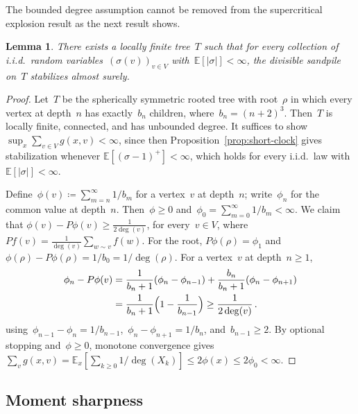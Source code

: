 \documentclass[aop]{imsart}
\theoremstyle{plain}
\newtheorem{lemma}[theorem]{Lemma}
\theoremstyle{definition}
\newcommand{\E}{\mathbb{E}}
\begin{document}
	The bounded degree assumption cannot be removed from the supercritical explosion result as the next result shows.
	\begin{lemma}\label{ex:counterexample}
		There exists a locally finite tree~$T$ such that for every collection of i.i.d.\ random variables~$(\sigma(v))_{v \in V}$ with~$\E[|\sigma|] < \infty$, the divisible sandpile on~$T$ stabilizes almost surely.
	\end{lemma}
	
	\begin{proof}
		Let~$T$ be the spherically symmetric rooted tree with root~$\rho$ in which every vertex at depth~$n$ has exactly~$b_n$ children, where~$b_n = (n+2)^3$. Then~$T$ is locally finite, connected, and has unbounded degree. It suffices to show $\sup_x\sum_{v\in V}g(x,v)<\infty$, since then Proposition~\ref{prop:short-clock} gives stabilization whenever $\E[(\sigma-1)^+]<\infty$, which holds for every i.i.d.\ law with $\E[|\sigma|]<\infty$.
		
		Define~$\phi(v) \coloneqq \sum_{m=n}^{\infty} 1/b_m$ for a vertex~$v$ at depth~$n$; write~$\phi_n$ for the common value at depth~$n$. Then~$\phi \geq 0$ and~$\phi_0 = \sum_{m=0}^{\infty} 1/b_m < \infty$. We claim that $\phi(v) - P\phi(v) \geq \frac{1}{2\deg(v)}$,
		for every~$v \in V$, where~$Pf(v) = \frac{1}{\deg(v)}\sum_{w \sim v} f(w)$. For the root, $P\phi(\rho)=\phi_1$ and $\phi(\rho)-P\phi(\rho)=1/b_0=1/\deg(\rho)$.
		For a vertex~$v$ at depth~$n \geq 1$,
		\begin{align*}
			\phi_n - P\phi(v) &= \frac{1}{b_n + 1}(\phi_n - \phi_{n-1}) + \frac{b_n}{b_n + 1}(\phi_n - \phi_{n+1}) \\
			&= \frac{1}{b_n + 1}\Bigl(1 - \frac{1}{b_{n-1}}\Bigr) \geq \frac{1}{2\deg(v)}\,.
		\end{align*}
		using~$\phi_{n-1} - \phi_n = 1/b_{n-1}$,~$\phi_n - \phi_{n+1} = 1/b_n$, and~$b_{n-1} \geq 2$. By optional stopping and~$\phi\geq 0$, monotone convergence gives $\sum_v g(x,v)=\E_x[\sum_{k\geq 0}1/\deg(X_k)]\leq 2\phi(x)\leq 2\phi_0<\infty$.
	\end{proof}
	
	
	\subsection{Moment sharpness}
	
\end{document}

